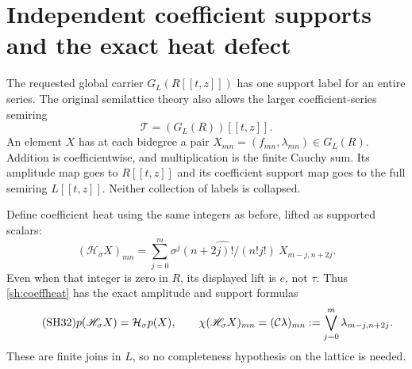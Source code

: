 \section{Independent coefficient supports and the exact heat defect}

The requested global carrier $G_L(R[[t,z]])$ has one support
label for an entire series. The original semilattice theory also
allows the larger coefficient-series semiring
\[
 \mathscr T=(G_L(R))[[t,z]].
\]
An element $X$ has at each bidegree a pair
$X_{mn}=(f_{mn},\lambda_{mn})\in G_L(R)$.
Addition is coefficientwise, and multiplication is the finite
Cauchy sum. Its amplitude map goes to $R[[t,z]]$ and its
coefficient support map goes to the full semiring $L[[t,z]]$.
Neither collection of labels is collapsed.

Define coefficient heat using the same integers as before,
lifted as supported scalars:
\begin{equation}\tag{SH31}\label{sh:coeffheat}
 (\mathscr H_\sigma X)_{mn}
 =\sum_{j=0}^m
 \widehat{\sigma^j(n+2j)!/(n!j!)}\ X_{m-j,n+2j}.
\end{equation}
Even when that integer is zero in $R$, its displayed lift is
$e$, not $\tau$. Thus \eqref{sh:coeffheat} has the exact
amplitude and support formulas
\begin{equation}\tag{SH32}\label{sh:coeffformula}
 p(\mathscr H_\sigma X)=\mathcal H_\sigma p(X),\qquad
 \chi(\mathscr H_\sigma X)_{mn}
       =(\mathcal C\lambda)_{mn}
       :=\bigvee_{j=0}^m\lambda_{m-j,n+2j}.
\end{equation}
These are finite joins in $L$, so no completeness hypothesis
on the lattice is needed.

